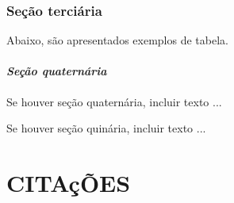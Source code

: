 \documentclass[
        oneside, %
        english,
        brazil
        ]{abntbibufjf}
\begin{document}
\subsection{\textbf{Seção terciária}} %

Abaixo, são apresentados exemplos de tabela.





\subsubsection{\textit{Seção quaternária}} %

Se houver seção quaternária, incluir texto ...


Se houver seção quinária, incluir texto ...


\chapter{CITAç\~{O}ES} %
\end{document}
